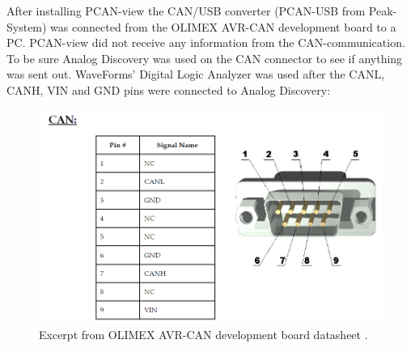 After installing PCAN-view the CAN/USB converter (PCAN-USB from Peak-System) was connected from the OLIMEX AVR-CAN development board to a PC. PCAN-view did not receive any information from the CAN-communication. To be sure Analog Discovery was used on the CAN connector to see if anything was sent out. WaveForms' Digital Logic Analyzer was used after the CANL, CANH, VIN and GND pins were connected to Analog Discovery:\\
\begin{figure}[H]
	\centering
	\includegraphics[width=0.45\linewidth]{Software/SnipFromOlimexDatasheet.PNG}
	\caption{Excerpt from OLIMEX AVR-CAN development board datasheet \cite{BMSAVRCAN}.}
	\label{fig:OLIMEX_AVR-CAN_BMS}
\end{figure}

